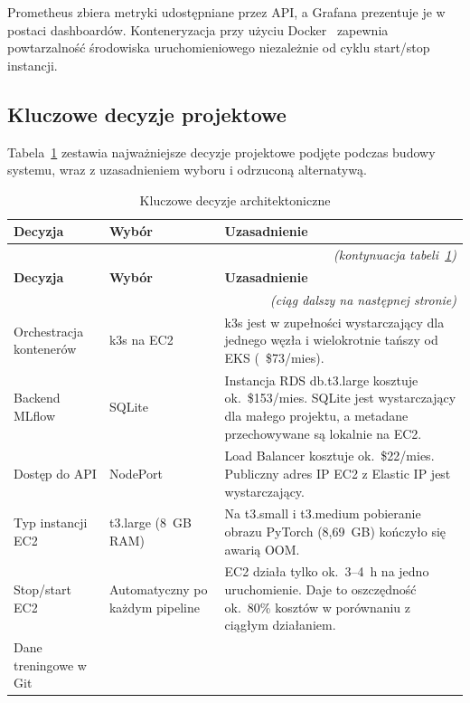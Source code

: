 Prometheus zbiera metryki udostępniane przez API, a Grafana prezentuje je w postaci dashboardów. Konteneryzacja przy użyciu Docker~\cite{merkel2014docker} zapewnia powtarzalność środowiska uruchomieniowego niezależnie od cyklu start/stop instancji.

\subsection{Kluczowe decyzje projektowe}

Tabela~\ref{tab:decisions} zestawia najważniejsze decyzje projektowe podjęte podczas budowy systemu, wraz z uzasadnieniem wyboru i odrzuconą alternatywą.

\begin{longtable}{p{3.5cm}p{3.2cm}p{8.5cm}}
\caption{Kluczowe decyzje architektoniczne}\label{tab:decisions} \\
\toprule
\textbf{Decyzja} & \textbf{Wybór} & \textbf{Uzasadnienie} \\
\midrule
\endfirsthead
\multicolumn{3}{r}{\footnotesize\textit{(kontynuacja tabeli~\ref{tab:decisions})}} \\[2pt]
\toprule
\textbf{Decyzja} & \textbf{Wybór} & \textbf{Uzasadnienie} \\
\midrule
\endhead
\multicolumn{3}{r}{\footnotesize\textit{(ciąg dalszy na następnej stronie)}} \\
\endfoot
\bottomrule
\endlastfoot
Orchestracja \newline kontenerów
  & k3s na EC2
  & k3s jest w zupełności wystarczający dla jednego węzła i wielokrotnie tańszy od EKS (~\$73/mies). \\
\addlinespace
Backend MLflow
  & SQLite
  & Instancja RDS db.t3.large kosztuje ok.~\$153/mies. SQLite jest wystarczający dla małego projektu, a metadane przechowywane są lokalnie na EC2. \\
\addlinespace
Dostęp do API
  & NodePort
  & Load Balancer kosztuje ok.~\$22/mies. Publiczny adres IP EC2 z Elastic IP jest wystarczający. \\
\addlinespace
Typ instancji EC2
  & t3.large \newline(8~GB RAM)
  & Na t3.small i t3.medium pobieranie obrazu PyTorch (8,69~GB) kończyło się awarią OOM. \\
\addlinespace
Stop/start EC2
  & Automatyczny po każdym pipeline
  & EC2 działa tylko ok.~3--4~h na jedno uruchomienie. Daje to oszczędność ok.~80\% kosztów w porównaniu z ciągłym działaniem. \\
\addlinespace
Dane treningowe \newline w Git

\end{longtable}
